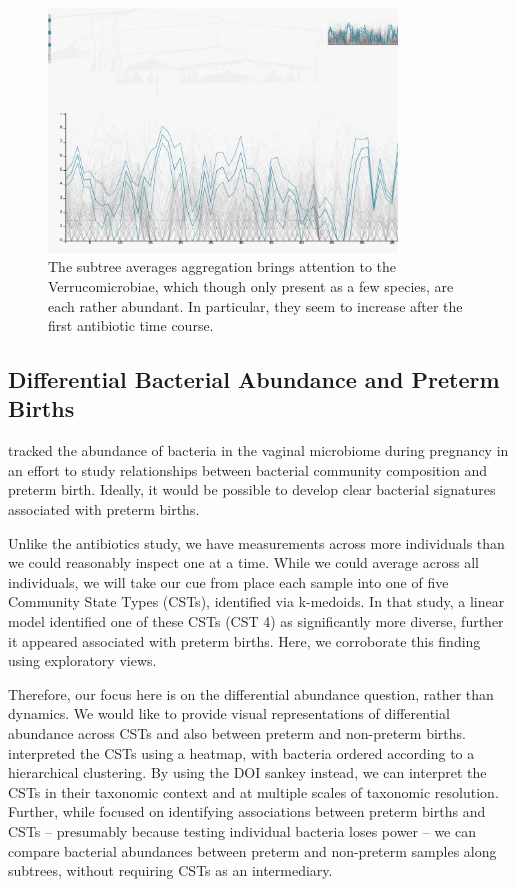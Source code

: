 \documentclass[12pt]{article}
\begin{document}
\begin{figure}

{\centering \includegraphics[width=350px]{figure/verrucomicrobiae}

}

\caption{The subtree averages aggregation brings attention to the
  Verrucomicrobiae, which though only present as a few species, are each rather
  abundant. In particular, they seem to increase after the first antibiotic time
  course.}\label{fig:verrucomicrobiae}
\end{figure}

\subsection{Differential Bacterial Abundance and Preterm
Births}\label{differential-bacterial-abundance-and-preterm-births}

\citet{digiulio2015temporal}
tracked the abundance of bacteria in the vaginal microbiome during
pregnancy in an effort to study relationships between bacterial
community composition and preterm birth. Ideally, it would be possible
to develop clear bacterial signatures associated with preterm births.

Unlike the antibiotics study, we have measurements across more
individuals than we could reasonably inspect one at a time. While we
could average across all individuals, we will take our cue from
\citep{digiulio2015temporal}
place each sample into one of five Community State Types (CSTs),
identified via k-medoids. In that study, a linear model identified one
of these CSTs (CST 4) as significantly more diverse, further it appeared
associated with preterm births. Here, we corroborate this finding using
exploratory views.

Therefore, our focus here is on the differential abundance question,
rather than dynamics. We would like to provide visual representations of
differential abundance across CSTs and also between preterm and non-preterm
births. \citet{digiulio2015temporal} interpreted the CSTs using a heatmap, with
bacteria ordered according to a hierarchical clustering. By using the DOI sankey
instead, we can interpret the CSTs in their taxonomic context and at multiple
scales of taxonomic resolution. Further, while
\citet{digiulio2015temporal} focused on identifying associations between
preterm births and CSTs -- presumably because testing individual bacteria loses
power -- we can compare bacterial abundances between preterm and non-preterm
samples along subtrees, without requiring CSTs as an intermediary.
\end{document}
